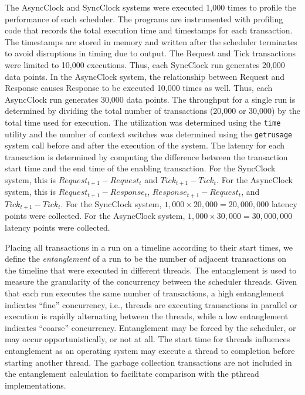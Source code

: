 The AsyncClock and SyncClock systems were executed 1,000 times to profile the performance of each scheduler.
The programs are instrumented with profiling code that records the total execution time and timestamps for each transaction.
The timestamps are stored in memory and written after the scheduler terminates to avoid disruptions in timing due to output.
The Request and Tick transactions were limited to 10,000 executions.
Thus, each SyncClock run generates 20,000 data points.
In the AsyncClock system, the relationship between Request and Response causes Response to be executed 10,000 times as well.
Thus, each AsyncClock run generates 30,000 data points.
The throughput for a single run is determined by dividing the total number of transactions (20,000 or 30,000) by the total time used for execution.
The utilization was determined using the \verb+time+ utility and the number of context switches was determined using the \verb+getrusage+ system call before and after the execution of the system.
The latency for each transaction is determined by computing the difference between the transaction start time and the end time of the enabling transaction.
For the SyncClock system, this is $Request_{t+1} - Request_{t}$ and $Tick_{t+1} - Tick_{t}$.
For the AsyncClock system, this is $Request_{t+1} - Response_{t}$, $Response_{t+1} - Request_{t}$, and $Tick_{t+1} - Tick_{t}$.
For the SyncClock system, $1,000 \times 20,000 = 20,000,000$ latency points were collected.
For the AsyncClock system, $1,000 \times 30,000 = 30,000,000$ latency points were collected.

Placing all transactions in a run on a timeline according to their start times, we define the \emph{entanglement} of a run to be the number of adjacent transactions on the timeline that were executed in different threads.
The entanglement is used to measure the granularity of the concurrency between the scheduler threads.
Given that each run executes the same number of transactions, a high entanglement indicates ``fine'' concurrency, i.e., threads are executing transactions in parallel or execution is rapidly alternating between the threads, while a low entanglement indicates ``coarse'' concurrency.
Entanglement may be forced by the scheduler, or may occur opportunistically, or not at all.
The start time for threads influences entanglement as an operating system may execute a thread to completion before starting another thread.
The garbage collection transactions are not included in the entanglement calculation to facilitate comparison with the pthread implementations.

